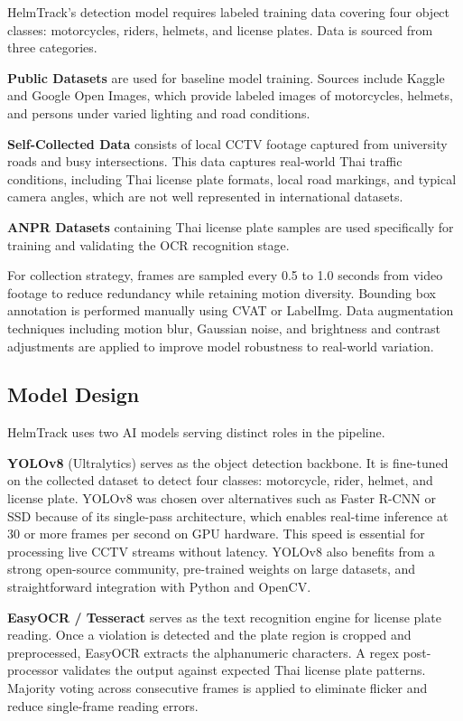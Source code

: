 HelmTrack's detection model requires labeled training data covering four object classes: motorcycles, riders, helmets, and license plates. Data is sourced from three categories.

\textbf{Public Datasets} are used for baseline model training. Sources include Kaggle and Google Open Images, which provide labeled images of motorcycles, helmets, and persons under varied lighting and road conditions.

\textbf{Self-Collected Data} consists of local CCTV footage captured from university roads and busy intersections. This data captures real-world Thai traffic conditions, including Thai license plate formats, local road markings, and typical camera angles, which are not well represented in international datasets.

\textbf{ANPR Datasets} containing Thai license plate samples are used specifically for training and validating the OCR recognition stage.

For collection strategy, frames are sampled every 0.5 to 1.0 seconds from video footage to reduce redundancy while retaining motion diversity. Bounding box annotation is performed manually using CVAT or LabelImg. Data augmentation techniques including motion blur, Gaussian noise, and brightness and contrast adjustments are applied to improve model robustness to real-world variation.

\subsection{Model Design}

HelmTrack uses two AI models serving distinct roles in the pipeline.

\textbf{YOLOv8} (Ultralytics) \cite{paper:yolov8} serves as the object detection backbone. It is fine-tuned on the collected dataset to detect four classes: motorcycle, rider, helmet, and license plate. YOLOv8 was chosen over alternatives such as Faster R-CNN or SSD because of its single-pass architecture, which enables real-time inference at 30 or more frames per second on GPU hardware. This speed is essential for processing live CCTV streams without latency. YOLOv8 also benefits from a strong open-source community, pre-trained weights on large datasets, and straightforward integration with Python and OpenCV.

\textbf{EasyOCR / Tesseract} serves as the text recognition engine for license plate reading. Once a violation is detected and the plate region is cropped and preprocessed, EasyOCR extracts the alphanumeric characters. A regex post-processor validates the output against expected Thai license plate patterns. Majority voting across consecutive frames is applied to eliminate flicker and reduce single-frame reading errors.

